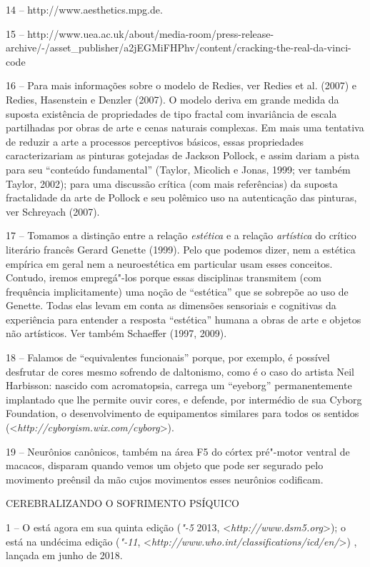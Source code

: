 14 -- http://www.aesthetics.mpg.de.

15 --
http://www.uea.ac.uk/about/media-room/press-release-archive/-/asset\_publisher/a2jEGMiFHPhv/content/cracking-the-real-da-vinci-code

16 -- Para mais informações sobre o modelo de Redies, ver Redies et al.
(2007) e Redies, Hasenstein e Denzler (2007). O modelo deriva em grande
medida da suposta existência de propriedades de tipo fractal com
invariância de escala partilhadas por obras de arte e cenas naturais
complexas. Em mais uma tentativa de reduzir a arte a processos
perceptivos básicos, essas propriedades caracterizariam as pinturas
gotejadas de Jackson Pollock, e assim dariam a pista para seu ``conteúdo
fundamental'' (Taylor, Micolich e Jonas, 1999; ver também Taylor, 2002);
para uma discussão crítica (com mais referências) da suposta
fractalidade da arte de Pollock e seu polêmico uso na autenticação das
pinturas, ver Schreyach (2007).

17 -- Tomamos a distinção entre a relação \emph{estética} e a relação
\emph{artística} do crítico literário francês Gerard Genette (1999).
Pelo que podemos dizer, nem a estética empírica em geral nem a
neuroestética em particular usam esses conceitos. Contudo, iremos
empregá"-los porque essas disciplinas transmitem (com frequência
implicitamente) uma noção de ``estética'' que se sobrepõe ao uso de
Genette. Todas elas levam em conta as dimensões sensoriais e cognitivas
da experiência para entender a resposta ``estética'' humana a obras de
arte e objetos não artísticos. Ver também Schaeffer (1997, 2009).

18 -- Falamos de ``equivalentes funcionais'' porque, por exemplo, é
possível desfrutar de cores mesmo sofrendo de daltonismo, como é o caso
do artista Neil Harbisson: nascido com acromatopsia, carrega um
``eyeborg'' permanentemente implantado que lhe permite ouvir cores, e
defende, por intermédio de sua Cyborg Foundation, o desenvolvimento de
equipamentos similares para todos os sentidos
(\textless{}\emph{http://cyborgism.wix.com/cyborg}\textgreater{}).

19 -- Neurônios canônicos, também na área F5 do córtex pré"-motor ventral
de macacos, disparam quando vemos um objeto que pode ser segurado pelo
movimento preênsil da mão cujos movimentos esses neurônios codificam.

CEREBRALIZANDO O SOFRIMENTO PSÍQUICO

1 -- O  está agora em sua quinta edição (\emph{"-5} 2013,
\textless{}\emph{http://www.dsm5.org}\textgreater{}); o \emph{} está na undécima edição
(\emph{"-11}, \textless{}\emph{http://www.who.int/classifications/icd/en/}\textgreater{}) ,
lançada em junho de 2018.

